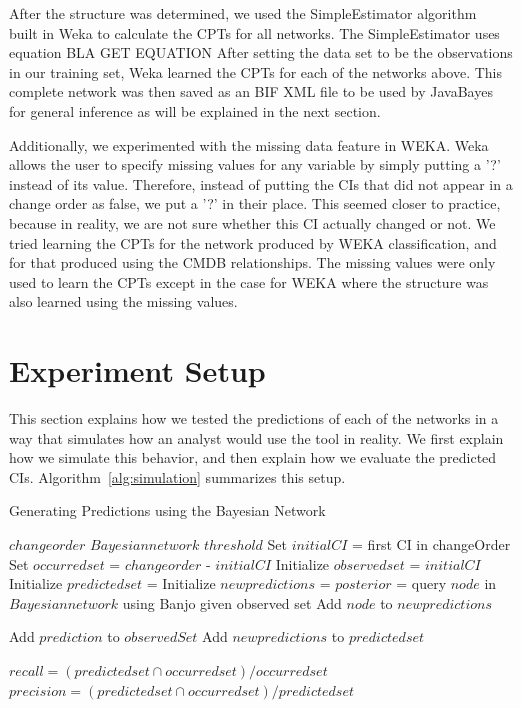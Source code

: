 \documentclass{article}
\begin{document}
After the structure was determined, we used the SimpleEstimator algorithm~\cite{witten2005data} built in Weka to calculate the CPTs for all networks. The
SimpleEstimator uses equation BLA GET EQUATION After setting the data set to be the observations in our training set, Weka learned the CPTs for each of the
networks above. This complete network was then saved as an BIF XML file to be used by JavaBayes for general inference as will be explained in the next section.

Additionally, we experimented with the missing data feature in WEKA. Weka allows the user to specify missing values
for any variable by simply putting a '?' instead of its value. Therefore, instead of putting the CIs that did not appear in a change order as false, we put a
'?' in their place. This seemed closer to practice, because in reality, we are not sure whether this CI actually changed or not. We tried learning the CPTs for
the network produced by WEKA classification, and for that produced using the CMDB relationships. The missing values were only used to learn the CPTs except in
the case for WEKA where the structure was also learned using the missing values.


\section{Experiment Setup}
\label{sec:setup}

This section explains how we tested the predictions of each of the networks in a way that simulates how an analyst would use the tool in reality. We first
explain how we simulate this behavior, and then explain how we evaluate the predicted CIs. Algorithm~\ref{alg:simulation} summarizes this setup.

\begin{algorithm}[tb]
   \caption{Generating Predictions using the Bayesian Network}
   \label{alg:simulation}
\begin{algorithmic}
    $change order$
     $Bayesian network$
     $threshold$
    \STATE Set $initial CI$ = first CI in changeOrder
    \STATE Set $occurred set$ = $change order$ - $initial CI$
    \STATE Initialize $observed set$ = {$initial CI$}
    \STATE Initialize $predicted set$ = {}
   \REPEAT  
    \STATE Initialize $new predictions$ = {}
    \STATE $posterior$ = query $node$ in $Bayesian network$ using Banjo given observed set
      \STATE Add $node$ to $new predictions$   
    \ENDIF
    \ENDFOR

      \STATE Add $prediction$ to $observedSet$
    \ENDIF
    \ENDFOR
\STATE Add $new predictions$ to $predicted set$

\STATE $recall = (predicted set \cap occurred set)/occurred set$
\STATE $precision = (predicted set \cap occurred set)/predicted set$
\end{algorithmic}
\end{algorithm}
\end{document}
